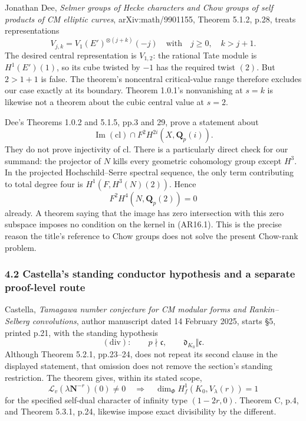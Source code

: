 \documentclass[11pt,a4paper]{article}
\begin{document}
Jonathan Dee, \emph{Selmer groups of Hecke characters and Chow groups of
self products of CM elliptic curves}, arXiv:math/9901155, Theorem 5.1.2,
p.28, treats representations \[
V_{j,k}=V_1(E')^{\otimes(j+k)}(-j)
\quad\text{with}\quad j\ge0,\quad k>j+1.
\] The desired central representation is \(V_{1,2}\): the rational Tate
module is \(H^1(E')(1)\), so its cube twisted by \(-1\) has the required
twist \((2)\). But \(2>1+1\) is false. The theorem's noncentral
critical-value range therefore excludes our case exactly at its
boundary. Theorem 1.0.1's nonvanishing at \(s=k\) is likewise not a
theorem about the cubic central value at \(s=2\).

Dee's Theorems 1.0.2 and 5.1.5, pp.3 and 29, prove a statement about \[
\operatorname{Im}(\mathrm{cl})\cap
F^2H^{2i}(X,\mathbf Q_p(i)).
\] They do not prove injectivity of \(\mathrm{cl}\). There is a
particularly direct check for our summand: the projector of \(N\) kills
every geometric cohomology group except \(H^3\). In the projected
Hochschild--Serre spectral sequence, the only term contributing to total
degree four is \(H^1(F,H^3(N)(2))\). Hence \[
F^2H^4(N,\mathbf Q_p(2))=0
\] already. A theorem saying that the image has zero intersection with
this zero subspace imposes no condition on the kernel in (AR16.1). This
is the precise reason the title's reference to Chow groups does not
solve the present Chow-rank problem.

\subsubsection{4.2 Castella's standing conductor hypothesis and a
separate proof-level
route}\label{castellas-standing-conductor-hypothesis-and-a-separate-proof-level-route}

Castella, \emph{Tamagawa number conjecture for CM modular forms and
Rankin--Selberg convolutions}, author manuscript dated 14 February 2025,
starts §5, printed p.21, with the standing hypothesis \[
(\mathrm{div}):\qquad p\nmid\mathfrak c,\qquad
\mathfrak d_{K_0}\Vert\mathfrak c.
\] Although Theorem 5.2.1, pp.23--24, does not repeat its second clause
in the displayed statement, that omission does not remove the section's
standing restriction. The theorem gives, within its stated scope, \[
\mathcal L_v(\lambda\mathbf N^{-r})(0)\ne0
\quad\Longrightarrow\quad
\dim_\Phi H^1_f(K_0,V_\lambda(r))=1
\tag{AR17.2}
\] for the specified self-dual character of infinity type \((1-2r,0)\).
Theorem C, p.4, and Theorem 5.3.1, p.24, likewise impose exact
divisibility by the different.
\end{document}
